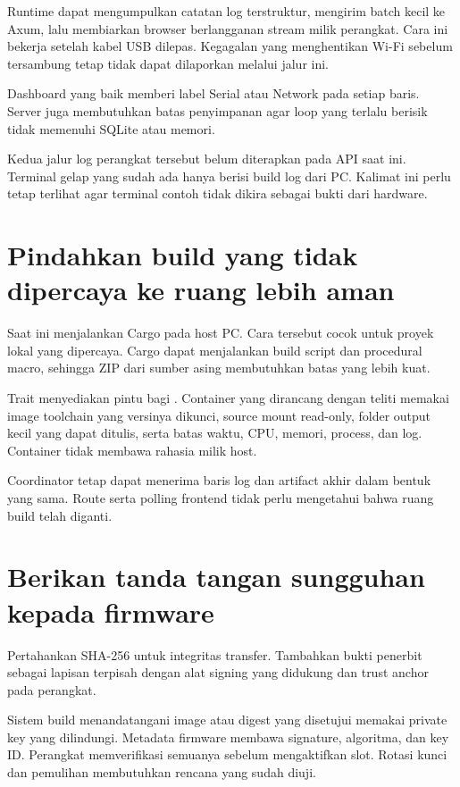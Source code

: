 Runtime dapat mengumpulkan catatan log terstruktur, mengirim batch kecil ke Axum, lalu membiarkan browser berlangganan stream milik perangkat. Cara ini bekerja setelah kabel USB dilepas. Kegagalan yang menghentikan Wi-Fi sebelum tersambung tetap tidak dapat dilaporkan melalui jalur ini.

Dashboard yang baik memberi label Serial atau Network pada setiap baris. Server juga membutuhkan batas penyimpanan agar loop yang terlalu berisik tidak memenuhi SQLite atau memori.

\begin{mentorbox}
Kedua jalur log perangkat tersebut belum diterapkan pada API saat ini. Terminal gelap yang sudah ada hanya berisi build log dari PC. Kalimat ini perlu tetap terlihat agar terminal contoh tidak dikira sebagai bukti dari hardware.
\end{mentorbox}

\section{Pindahkan build yang tidak dipercaya ke ruang lebih aman}

Saat ini  menjalankan Cargo pada host PC. Cara tersebut cocok untuk proyek lokal yang dipercaya. Cargo dapat menjalankan build script dan procedural macro, sehingga ZIP dari sumber asing membutuhkan batas yang lebih kuat.

Trait  menyediakan pintu bagi . Container yang dirancang dengan teliti memakai image toolchain yang versinya dikunci, source mount read-only, folder output kecil yang dapat ditulis, serta batas waktu, CPU, memori, process, dan log. Container tidak membawa rahasia milik host.

Coordinator tetap dapat menerima baris log dan artifact akhir dalam bentuk yang sama. Route serta polling frontend tidak perlu mengetahui bahwa ruang build telah diganti.

\section{Berikan tanda tangan sungguhan kepada firmware}

Pertahankan SHA-256 untuk integritas transfer. Tambahkan bukti penerbit sebagai lapisan terpisah dengan alat signing yang didukung dan trust anchor pada perangkat.

Sistem build menandatangani image atau digest yang disetujui memakai private key yang dilindungi. Metadata firmware membawa signature, algoritma, dan key ID. Perangkat memverifikasi semuanya sebelum mengaktifkan slot. Rotasi kunci dan pemulihan membutuhkan rencana yang sudah diuji.

